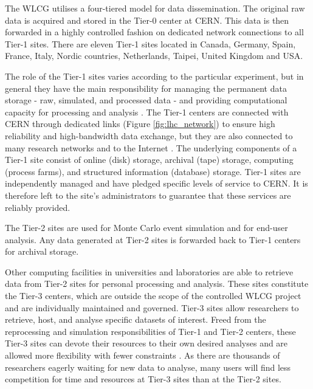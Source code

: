 The WLCG utilises a four-tiered model for data dissemination. The original raw data is acquired and stored in the Tier-0 center at CERN. This data is then forwarded in a highly controlled fashion on dedicated network connections to all Tier-1 sites. There are eleven Tier-1 sites located in Canada, Germany, Spain, France, Italy, Nordic countries, Netherlands, Taipei, United Kingdom and USA.

The role of the Tier-1 sites varies according to the particular experiment, but in general they have the main responsibility for managing the permanent data storage - raw, simulated, and processed data - and providing computational capacity for processing and analysis \cite{Knobloch6}. The Tier-1 centers are connected with CERN through dedicated links (Figure \ref{fig:lhc_network}) to ensure high reliability and high-bandwidth data exchange, but they are also connected to many research networks and to the Internet \cite{LHCGrid7}. The underlying components of a Tier-1 site consist of online (disk) storage, archival (tape) storage, computing (process farms), and structured information (database) storage. Tier-1 sites are independently managed and have pledged specific levels of service to CERN. It is therefore left to the site’s administrators to guarantee that these services are reliably provided.

The Tier-2 sites are used for Monte Carlo event simulation and for end-user analysis. Any data generated at Tier-2 sites is forwarded back to Tier-1 centers for archival storage.

Other computing facilities in universities and laboratories are able to retrieve data from Tier-2 sites for personal processing and analysis. These sites constitute the Tier-3 centers, which are outside the scope of the controlled WLCG project and are individually maintained and governed. Tier-3 sites allow researchers to retrieve, host, and analyse specific datasets of interest. Freed from the reprocessing and simulation responsibilities of Tier-1 and Tier-2 centers, these Tier-3 sites can devote their resources to their own desired analyses and are allowed more flexibility with fewer constraints \cite{Grim8}. As there are thousands of researchers eagerly waiting for new data to analyse, many users will find less competition for time and resources at Tier-3 sites than at the Tier-2 sites.

